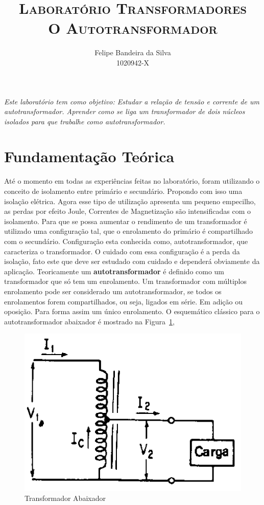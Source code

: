 \documentclass[paper=a4, fontsize=11pt]{article}
\title{\textsc{Laboratório Transformadores\\O Autotransformador}}
\author{Felipe Bandeira da Silva\\1020942-X}
\begin{document}
\maketitle


\textit{Este laboratório tem como objetivo: Estudar a relação de tensão e corrente 
de um autotransformador.  Aprender como se liga um transformador de dois núcleos
isolados para que trabalhe como autotransformador.}

\newpage

\tableofcontents

\newpage

\listoffigures

\newpage

\section{Fundamentação Teórica}

Até o momento em todas as experiências feitas no laboratório, foram utilizando o conceito
de isolamento entre primário e secundário. Propondo com isso uma isolação elétrica. Agora 
esse tipo de utilização apresenta um pequeno empecilho, as perdas por efeito Joule, Correntes
de Magnetização são intensificadas com o isolamento. Para que se possa aumentar o rendimento
de um transformador é utilizado uma configuração tal, que o enrolamento do primário é 
compartilhado com o secundário. Configuração esta conhecida como, autotransformador, que 
caracteriza o transformador. O cuidado com essa configuração é a perda da isolação, fato
este que deve ser estudado com cuidado e dependerá obviamente da aplicação. Teoricamente
um \textbf{autotransformador} é definido como um transformador que só tem um enrolamento. 
Um transformador com múltiplos enrolamento pode ser considerado um autotransformador, se todos os 
enrolamentos forem compartilhados, ou seja, ligados em série. Em adição ou oposição. Para
forma assim um único enrolamento. O esquemático clássico para o autotransformador  abaixador
é mostrado na Figura~\ref{abaixador},

\begin{figure}[!ht]
    \centering
    \includegraphics[scale=.4]{abaixador.png}
    \caption{Transformador Abaixador}
    \label{abaixador}
\end{figure}
\end{document}
